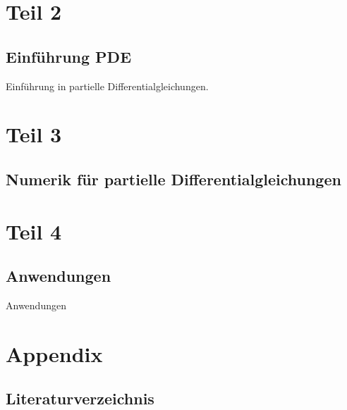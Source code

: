 \documentclass[letterpaper,10pt,english]{jupyterBook}
\begin{document}
\part{Teil 2}


\chapter{Einführung PDE}
\label{\detokenize{PDE/IntroPDE:einfuhrung-pde}}\label{\detokenize{PDE/IntroPDE::doc}}
Einführung in partielle Differentialgleichungen.


\part{Teil 3}


\chapter{Numerik für partielle Differentialgleichungen}
\label{\detokenize{NumerikPDE/NumerikPDE:numerik-fur-partielle-differentialgleichungen}}\label{\detokenize{NumerikPDE/NumerikPDE::doc}}

\part{Teil 4}


\chapter{Anwendungen}
\label{\detokenize{Applications/Applications:anwendungen}}\label{\detokenize{Applications/Applications::doc}}
Anwendungen


\part{Appendix}


\chapter{Literaturverzeichnis}
\label{\detokenize{Appendix:literaturverzeichnis}}\label{\detokenize{Appendix::doc}}
\end{document}
